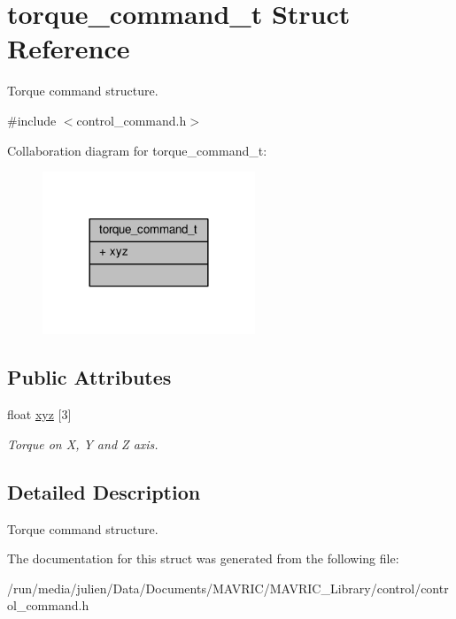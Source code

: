 \hypertarget{structtorque__command__t}{\section{torque\+\_\+command\+\_\+t Struct Reference}
\label{structtorque__command__t}
}


Torque command structure.  




{\ttfamily \#include $<$control\+\_\+command.\+h$>$}



Collaboration diagram for torque\+\_\+command\+\_\+t\+:
\nopagebreak
\begin{figure}[H]
\begin{center}
\leavevmode
\includegraphics[width=180pt]{structtorque__command__t__coll__graph}
\end{center}
\end{figure}
\subsection*{Public Attributes}
\begin{DoxyCompactItemize}
\item 
\hypertarget{structtorque__command__t_a97e398d3e28d4f8dd9f4e5aeddc89a0d}{float \hyperlink{structtorque__command__t_a97e398d3e28d4f8dd9f4e5aeddc89a0d}{xyz} \mbox{[}3\mbox{]}}\label{structtorque__command__t_a97e398d3e28d4f8dd9f4e5aeddc89a0d}

\begin{DoxyCompactList}\small\item\em Torque on X, Y and Z axis. \end{DoxyCompactList}\end{DoxyCompactItemize}


\subsection{Detailed Description}
Torque command structure. 

The documentation for this struct was generated from the following file\+:\begin{DoxyCompactItemize}
\item 
/run/media/julien/\+Data/\+Documents/\+M\+A\+V\+R\+I\+C/\+M\+A\+V\+R\+I\+C\+\_\+\+Library/control/control\+\_\+command.\+h\end{DoxyCompactItemize}
